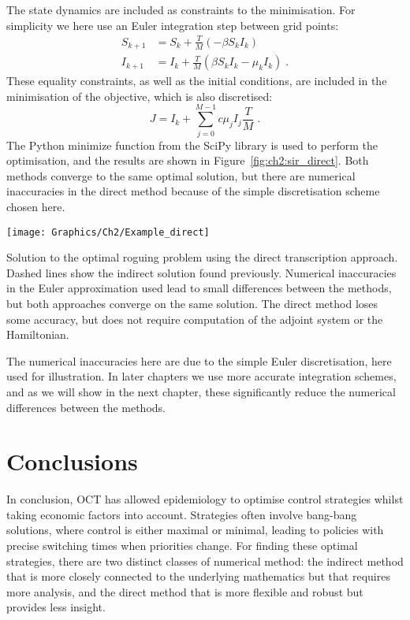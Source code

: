 \begin{example}
    The state dynamics are included as constraints to the minimisation. For simplicity we here use an Euler integration step between grid points:
    \begin{subequations}
        \begin{align}
            S_{k+1} &= S_k + \frac{T}{M} \left(-\beta{}S_kI_k\right)\\
            I_{k+1} &= I_k + \frac{T}{M} \left(\beta{}S_kI_k - \mu_kI_k\right)\;.
        \end{align}
    \end{subequations}
    These equality constraints, as well as the initial conditions, are included in the minimisation of the objective, which is also discretised:
    \begin{equation}
        J = I_k + \sum_{j=0}^{M-1}c\mu_jI_j\frac{T}{M}\;.
    \end{equation}
    The Python minimize function from the SciPy library \citep{scipy} is used to perform the optimisation, and the results are shown in Figure~\ref{fig:ch2:sir_direct}. Both methods converge to the same optimal solution, but there are numerical inaccuracies in the direct method because of the simple discretisation scheme chosen here.

    {
        \vspace*{1cm}
        \captionsetup{type=figure}
        \centering \texttt{[image: Graphics/Ch2/Example\_direct]}
        \caption[Optimal roguing strategy using the direct approach]{Solution to the optimal roguing problem using the direct transcription approach. Dashed lines show the indirect solution found previously. Numerical inaccuracies in the Euler approximation used lead to small differences between the methods, but both approaches converge on the same solution. The direct method loses some accuracy, but does not require computation of the adjoint system or the Hamiltonian.\label{fig:ch2:sir_direct}}
    }

    The numerical inaccuracies here are due to the simple Euler discretisation, here used for illustration. In later chapters we use more accurate integration schemes, and as we will show in the next chapter, these significantly reduce the numerical differences between the methods.

\end{example}

\section{Conclusions}

In conclusion, OCT has allowed epidemiology to optimise control strategies whilst taking economic factors into account. Strategies often involve bang-bang solutions, where control is either maximal or minimal, leading to policies with precise switching times when priorities change. For finding these optimal strategies, there are two distinct classes of numerical method: the indirect method that is more closely connected to the underlying mathematics but that requires more analysis, and the direct method that is more flexible and robust but provides less insight.
